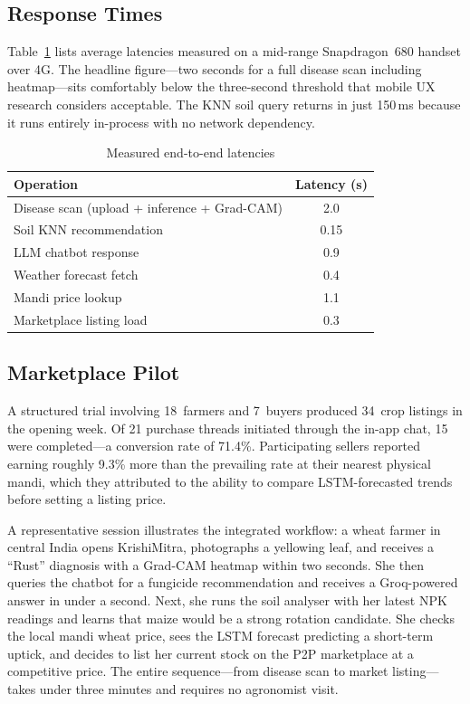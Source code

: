 \documentclass[conference]{IEEEtran}
\begin{document}
\subsection{Response Times}
Table~\ref{tab:perf} lists average latencies measured on a mid-range
Snapdragon~680 handset over 4G. The headline figure---two seconds for a full disease scan including
heatmap---sits comfortably below the three-second threshold that mobile UX research considers
acceptable. The KNN soil query returns in just 150\,ms because it runs entirely in-process with no
network dependency.

\begin{table}[t]
\centering \caption{Measured end-to-end latencies} \label{tab:perf}
\begin{tabular}{lc}
\toprule
\textbf{Operation} & \textbf{Latency (s)} \\
\midrule
Disease scan (upload + inference + Grad-CAM) & 2.0 \\
Soil KNN recommendation                     & 0.15 \\
LLM chatbot response                        & 0.9 \\
Weather forecast fetch                      & 0.4 \\
Mandi price lookup                           & 1.1 \\
Marketplace listing load                     & 0.3 \\
\bottomrule
\end{tabular}
\end{table}

\subsection{Marketplace Pilot}
A structured trial involving 18~farmers and 7~buyers produced 34~crop
listings in the opening week. Of 21 purchase threads initiated through the in-app chat, 15 were
completed---a conversion rate of 71.4\%. Participating sellers reported earning roughly 9.3\% more
than the prevailing rate at their nearest physical mandi, which they attributed to the ability to
compare LSTM-forecasted trends before setting a listing price.

A representative session illustrates the integrated workflow: a wheat farmer in central India opens
KrishiMitra, photographs a yellowing leaf, and receives a ``Rust'' diagnosis with a Grad-CAM heatmap
within two seconds. She then queries the chatbot for a fungicide recommendation and receives a
Groq-powered answer in under a second. Next, she runs the soil analyser with her latest NPK readings
and learns that maize would be a strong rotation candidate. She checks the local mandi wheat price,
sees the LSTM forecast predicting a short-term uptick, and decides to list her current stock on the
P2P marketplace at a competitive price. The entire sequence---from disease scan to market
listing---takes under three minutes and requires no agronomist visit.
\end{document}
